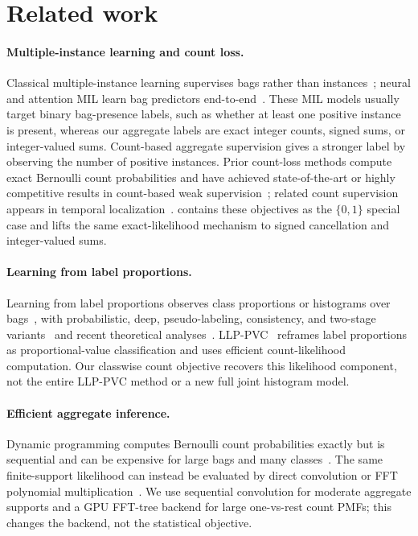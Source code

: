 \section{Related work}

\paragraph{Multiple-instance learning and count loss.}
Classical multiple-instance learning supervises bags rather than instances~\cite{dietterich1997mil,maron1998mil,andrew2002misvm,carbonneau2018milsurvey}; neural and attention MIL learn bag predictors end-to-end~\cite{wang2018minn,ilse2018attention}.
These MIL models usually target binary bag-presence labels, such as whether at least one positive instance is present, whereas our aggregate labels are exact integer counts, signed sums, or integer-valued sums.
Count-based aggregate supervision gives a stronger label by observing the number of positive instances.
Prior count-loss methods compute exact Bernoulli count probabilities and have achieved state-of-the-art or highly competitive results in count-based weak supervision~\cite{shukla2023count}; related count supervision appears in temporal localization~\cite{schroeter2019occurrence}.
\method{} contains these objectives as the $\{0,1\}$ special case and lifts the same exact-likelihood mechanism to signed cancellation and integer-valued sums.

\paragraph{Learning from label proportions.}
Learning from label proportions observes class proportions or histograms over bags~\cite{quadrianto2009llp,yu2014llp}, with probabilistic, deep, pseudo-labeling, consistency, and two-stage variants~\cite{sun2017probabilistic,bortsova2018emphysema,hsu2019multiclass,dulacarnold2019deep,liu2019llpgan,tsai2020consistency,liu2021twostage,yang2021featurelabel,ma2025hil} and recent theoretical analyses~\cite{scott2020mutual,zhang2022labelnoise,busa2023easyllp,wei2023uum,applebaum2025generalupm,busafekete2025sample}.
LLP-PVC~\cite{ma2026llppvc} reframes label proportions as proportional-value classification and uses efficient count-likelihood computation.
Our classwise count objective recovers this likelihood component, not the entire LLP-PVC method or a new full joint histogram model.

\paragraph{Efficient aggregate inference.}
Dynamic programming computes Bernoulli count probabilities exactly but is sequential and can be expensive for large bags and many classes~\cite{ma2026llppvc}.
The same finite-support likelihood can instead be evaluated by direct convolution or FFT polynomial multiplication~\cite{cooley1965fft}.
We use sequential convolution for moderate aggregate supports and a GPU FFT-tree backend for large one-vs-rest count PMFs; this changes the backend, not the statistical objective.

